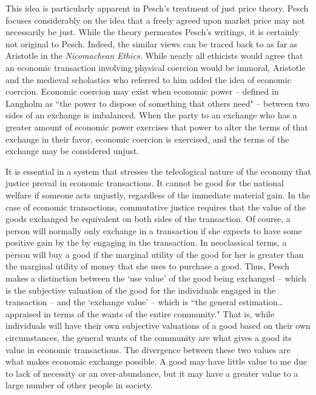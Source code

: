 \documentclass{article}
\begin{document}
This idea is particularly apparent in Pesch’s treatment of just price theory.  Pesch focuses considerably on the idea that a freely agreed upon market price may not necessarily be just.  While the theory permeates Pesch’s writings, it is certainly not original to Pesch.  Indeed, the similar views can be traced back to as far as Aristotle in the \emph{Nicomachean Ethics}.  While nearly all ethicists would agree that an economic transaction involving physical coercion would be immoral, Aristotle and the medieval scholastics who referred to him added the idea of economic coercion. \citep{langholm2014}  Economic coercion may exist when economic power – defined in Langholm as ``the power to dispose of something that others need"  – between two sides of an exchange is imbalanced.  When the party to an exchange who has a greater amount of economic power exercises that power to alter the terms of that exchange in their favor, economic coercion is exercised, and the terms of the exchange may be considered unjust.\medskip

It is essential in a system that stresses the teleological nature of the economy that justice prevail in economic transactions.  It cannot be good for the national welfare if someone acts unjustly, regardless of the immediate material gain.  In the case of economic transactions, commutative justice requires that the value of the goods exchanged be equivalent on both sides of the transaction.  Of course, a person will normally only exchange in a transaction if she expects to have some positive gain by the by engaging in the transaction.  In neoclassical terms, a person will buy a good if the marginal utility of the good for her is greater than the marginal utility of money that she uses to purchase a good.  Thus, Pesch makes a distinction between the ‘use value’ of the good being exchanged – which is the subjective valuation of the good for the individuals engaged in the transaction – and the ‘exchange value’ – which is ``the general estimation… appraised in terms of the wants of the entire community." \citep[p. 215]{pesch1998}  That is, while individuals will have their own subjective valuations of a good based on their own circumstances, the general wants of the community are what gives a good its value in economic transactions.  The divergence between these two values are what makes economic exchange possible.  A good may have little value to me due to lack of necessity or an over-abundance, but it may have a greater value to a large number of other people in society.\medskip
\end{document}
